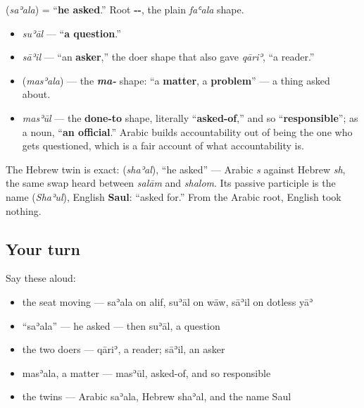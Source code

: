 \begin{cousinweb}
\textbf{} (\emph{saʾala}) = \textquotedblleft{}\textbf{he asked}.\textquotedblright{} Root \textbf{--}, the plain \emph{faʿala} shape.

\begin{itemize}
\raggedright
  \item \emph{suʾāl} — \textquotedblleft{}\textbf{a question}.\textquotedblright{}
  \item \emph{sāʾil} — \textquotedblleft{}an \textbf{asker},\textquotedblright{} the doer shape that also gave \emph{qāriʾ}, \textquotedblleft{}a reader.\textquotedblright{}
  \item \textbf{} (\emph{masʾala}) — the \emph{\textbf{ma-}} shape: \textquotedblleft{}a \textbf{matter}, a \textbf{problem}\textquotedblright{} — a thing asked about.
  \item \emph{masʾūl} — the \textbf{done-to} shape, literally \textquotedblleft{}\textbf{asked-of},\textquotedblright{} and so \textquotedblleft{}\textbf{responsible}\textquotedblright{}; as a noun, \textquotedblleft{}\textbf{an official}.\textquotedblright{} Arabic builds accountability out of being the one who gets questioned, which is a fair account of what accountability is.
\end{itemize}

The Hebrew twin is exact: \textbf{} (\emph{shaʾal}), \textquotedblleft{}he asked\textquotedblright{} — Arabic \emph{s} against Hebrew \emph{sh}, the same swap heard between \emph{salām} and \emph{shalom}. Its passive participle is the name \textbf{} (\emph{Shaʾul}), English \textbf{Saul}: \textquotedblleft{}asked for.\textquotedblright{} From the Arabic root, English took nothing.
\end{cousinweb}

\subsection*{Your turn}
Say these aloud:

\begin{itemize}
\raggedright
  \item the seat moving — saʾala on alif, suʾāl on wāw, sāʾil on dotless yāʾ
  \item \textquotedblleft{}saʾala\textquotedblright{} — he asked — then suʾāl, a question
  \item the two doers — qāriʾ, a reader; sāʾil, an asker
  \item masʾala, a matter — masʾūl, asked-of, and so responsible
  \item the twins — Arabic saʾala, Hebrew shaʾal, and the name Saul
\end{itemize}

